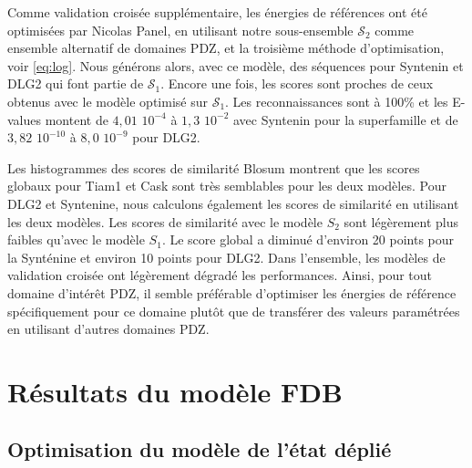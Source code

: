 Comme validation croisée supplémentaire, les énergies de références ont été optimisées par Nicolas Panel, en utilisant notre sous-ensemble $\mathcal{S}_2$ comme ensemble alternatif de domaines PDZ, et la troisième méthode d'optimisation, voir \ref{eq:log}. Nous générons alors, avec ce modèle, des séquences pour Syntenin et DLG2 qui font partie de $\mathcal{S}_1$. Encore une fois, les scores sont proches de ceux obtenus avec le modèle optimisé sur $\mathcal{S}_1$. Les reconnaissances sont à 100\% et les E-values montent de $4,01$ $10^{-4}$  à $1,3$ $10^{-2}$  avec Syntenin pour la superfamille et de $3,82$ $10^{-10}$  à $8,0$ $10^{-9}$ pour DLG2.

Les histogrammes des scores de similarité Blosum montrent que les scores globaux pour Tiam1 et Cask sont très semblables pour les deux modèles. Pour DLG2 et Syntenine, nous calculons également les scores de similarité en utilisant les deux modèles. Les scores de similarité avec le modèle $S_2$  sont légèrement plus faibles qu'avec le modèle $S_1$. Le score global a diminué d'environ 20 points pour la Synténine et environ 10 points pour DLG2. Dans l'ensemble, les modèles de validation croisée ont légèrement dégradé les performances. Ainsi, pour tout domaine d'intérêt PDZ, il semble préférable d'optimiser les énergies de référence spécifiquement pour ce domaine plutôt que de transférer des valeurs paramétrées en utilisant d'autres domaines PDZ. 

\section{Résultats du modèle FDB}

\subsection{Optimisation du modèle de l'état déplié}

